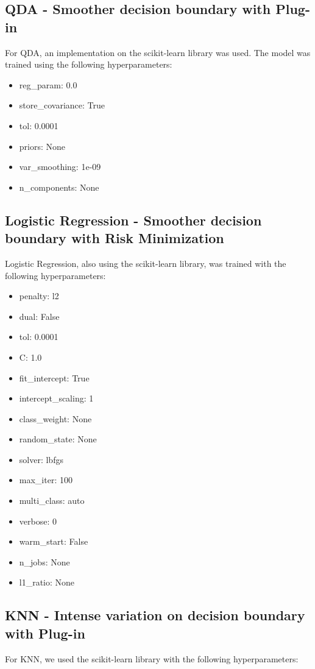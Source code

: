 \documentclass[conference]{IEEEtran}
\begin{document}
\subsection{QDA - Smoother decision boundary with Plug-in}
For QDA, an implementation on the scikit-learn library was used. The model was trained using the following hyperparameters: 
\begin{itemize}
    \item reg\_param: 0.0
    \item store\_covariance: True
    \item tol: 0.0001
    \item priors: None
    \item var\_smoothing: 1e-09
    \item n\_components: None
\end{itemize}

\subsection{Logistic Regression - Smoother decision boundary with Risk Minimization}
Logistic Regression, also using the scikit-learn library, was trained with the following hyperparameters:
\begin{itemize}
    \item penalty: l2
    \item dual: False
    \item tol: 0.0001
    \item C: 1.0
    \item fit\_intercept: True
    \item intercept\_scaling: 1
    \item class\_weight: None
    \item random\_state: None
    \item solver: lbfgs
    \item max\_iter: 100
    \item multi\_class: auto
    \item verbose: 0
    \item warm\_start: False
    \item n\_jobs: None
    \item l1\_ratio: None
\end{itemize}

\subsection{KNN - Intense variation on decision boundary with Plug-in}
For KNN, we used the scikit-learn library with the following hyperparameters:
\end{document}
